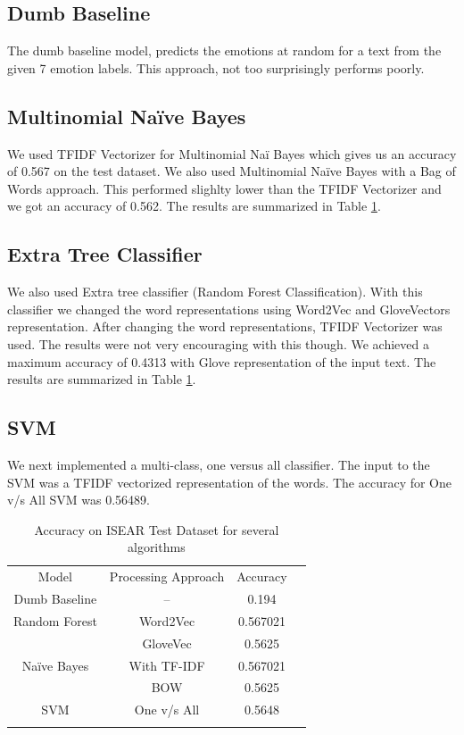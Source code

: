 \documentclass[conference]{IEEEtran}
\numberwithin{equation}{section}
\numberwithin{figure}{section}
\numberwithin{table}{section}
\begin{document}
\subsection{Dumb Baseline}
The dumb baseline model, predicts the emotions at random for a text from the given 7 emotion labels. This approach, not too surprisingly performs poorly.

\subsection{Multinomial Na{\"i}ve Bayes}
We used TFIDF Vectorizer for Multinomial Na{\"i} Bayes which gives us an accuracy of 0.567 on the test dataset. We also used Multinomial Na{\"i}ve Bayes with a Bag of Words approach. This performed slighlty lower than the TFIDF Vectorizer and we got an accuracy of 0.562. The results are summarized in Table \ref{tab_nb}. 

\subsection{Extra Tree Classifier}
We also used Extra tree classifier (Random Forest Classification). With this classifier we changed the word representations using Word2Vec and GloveVectors representation. After changing the word representations, TFIDF Vectorizer was used. The results were not very encouraging with this though. We achieved a maximum accuracy of 0.4313 with Glove representation of the input text. The results are summarized in Table \ref{tab_nb}.

\subsection{SVM	}
We next implemented a multi-class, one versus all classifier. The input to the SVM was a TFIDF vectorized representation of the words. The accuracy for One v/s All SVM was 0.56489. 

\begin{table}[!htb]
 \centering
 \caption{Accuracy on ISEAR Test Dataset for several algorithms}
 \label{tab_nb}
\begin{tabular}{ c c c c  } 
    \noalign{\smallskip}\hline\noalign{\smallskip}
   Model &  Processing Approach & Accuracy \\
       \noalign{\smallskip}\hline\noalign{\smallskip}
\multirow{1}{8em} {Dumb Baseline} &   -- & 0.194\\
    \noalign{\smallskip}\hline\noalign{\smallskip}
\multirow{2}{8em} {Random Forest} &   Word2Vec & 0.567021\\
&  GloveVec & 0.5625\\                
 \noalign{\smallskip}\hline\noalign{\smallskip}
\multirow{2}{8em} {Na{\"i}ve Bayes} &   With TF-IDF & 0.567021\\
&  BOW & 0.5625\\                
 \noalign{\smallskip}\hline\noalign{\smallskip}
\multirow{1}{8em} {SVM} &  One v/s All & 0.5648\\
    \noalign{\smallskip}\hline
  \end{tabular} 
\end{table}
\end{document}
